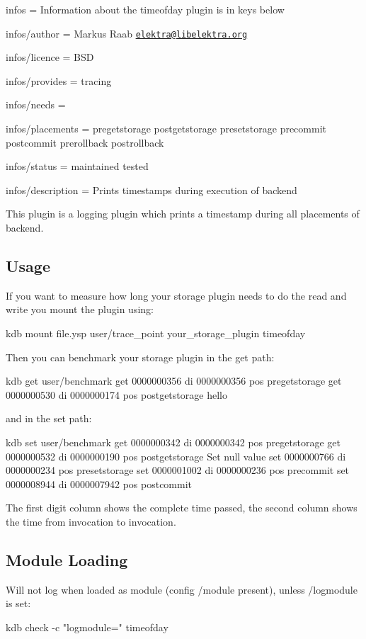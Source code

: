 
\begin{DoxyItemize}
\item infos = Information about the timeofday plugin is in keys below
\item infos/author = Markus Raab \href{mailto:elektra@libelektra.org}{\tt elektra@libelektra.\+org}
\item infos/licence = B\+S\+D
\item infos/provides = tracing
\item infos/needs =
\item infos/placements = pregetstorage postgetstorage presetstorage precommit postcommit prerollback postrollback
\item infos/status = maintained tested
\item infos/description = Prints timestamps during execution of backend
\end{DoxyItemize}

This plugin is a logging plugin which prints a timestamp during all placements of backend.

\subsection*{Usage}

If you want to measure how long your storage plugin needs to do the read and write you mount the plugin using\+: \begin{DoxyVerb}kdb mount file.ysp user/trace_point your_storage_plugin timeofday
\end{DoxyVerb}


Then you can benchmark your storage plugin in the get path\+: \begin{DoxyVerb}kdb get user/benchmark
get     0000000356      di      0000000356      pos     pregetstorage
get     0000000530      di      0000000174      pos     postgetstorage
hello
\end{DoxyVerb}


and in the set path\+: \begin{DoxyVerb}kdb set user/benchmark
get     0000000342      di      0000000342      pos     pregetstorage
get     0000000532      di      0000000190      pos     postgetstorage
Set null value
set     0000000766      di      0000000234      pos     presetstorage
set     0000001002      di      0000000236      pos     precommit
set     0000008944      di      0000007942      pos     postcommit
\end{DoxyVerb}


The first digit column shows the complete time passed, the second column shows the time from invocation to invocation.

\subsection*{Module Loading}

Will not log when loaded as module (config {\ttfamily /module} present), unless {\ttfamily /logmodule} is set\+: \begin{DoxyVerb}kdb check -c "logmodule=" timeofday\end{DoxyVerb}
 